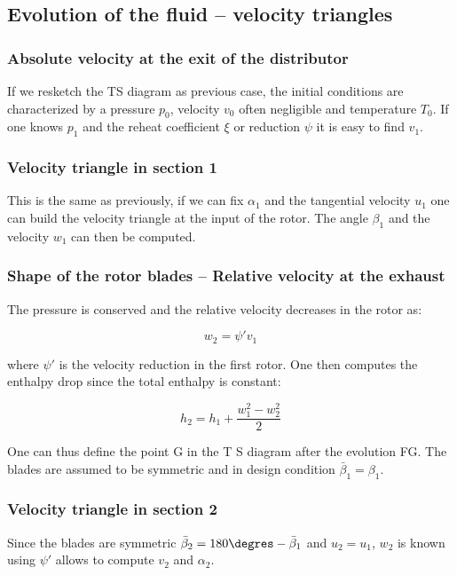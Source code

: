 \subsection{Evolution of the fluid – velocity triangles}
\subsubsection{Absolute velocity at the exit of the distributor}
If we resketch the TS diagram as previous case, the initial conditions are characterized by a pressure $p_0$, velocity $v_0$ often negligible and temperature $T_0$. If one knows $p_1$ and the reheat coefficient $\xi$ or reduction $\psi$ it is easy to find $v_1$. 

\subsubsection{Velocity triangle in section 1}
This is the same as previously, if we can fix $\alpha _1$ and the tangential velocity $u_1$ one can build the velocity triangle at the input of the rotor. The angle $\beta _1 $ and the velocity $w_1$ can then be computed. 

\subsubsection{Shape of the rotor blades – Relative velocity at the exhaust}
The pressure is conserved and the relative velocity decreases in the rotor as: 

\begin{equation}
w_2 = \psi ' v_1
\end{equation}

where $\psi '$ is the velocity reduction in the first rotor. One then computes the enthalpy drop since the total enthalpy is constant: 

\begin{equation}
h_2 = h_1 + \frac{w_1^2 - w_2^2}{2}
\end{equation}

One can thus define the point G in the T S diagram after the evolution FG. The blades are assumed to be symmetric and in design condition $\bar{\beta} _1 = \beta _1$. 

\subsubsection{Velocity triangle in section 2}
Since the blades are symmetric $\bar{\beta} _2= 180 \degres - \bar{\beta}_1$ and $u_2 = u_1$, $w_2$ is known using $\psi '$ allows to compute $v_2$ and $\alpha _2$.

